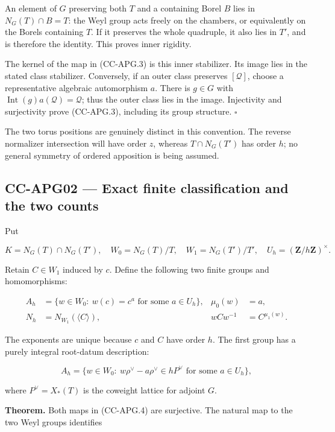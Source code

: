 An element of \(G\) preserving both \(T\) and a containing Borel \(B\)
lies in \(N_G(T)\cap B=T\): the Weyl group acts freely on the chambers,
or equivalently on the Borels containing \(T\). If it preserves the
whole quadruple, it also lies in \(T'\), and is therefore the identity.
This proves inner rigidity.

The kernel of the map in (CC-APG.3) is this inner stabilizer. Its image
lies in the stated class stabilizer. Conversely, if an outer class
preserves \([\mathcal Q]\), choose a representative algebraic
automorphism \(a\). There is \(g\in G\) with
\(\operatorname{Int}(g)a(\mathcal Q)=\mathcal Q\); thus the outer class
lies in the image. Injectivity and surjectivity prove (CC-APG.3),
including its group structure. \(\square\)

The two torus positions are genuinely distinct in this convention. The
reverse normalizer intersection will have order \(z\), whereas
\(T\cap N_G(T')\) has order \(h\); no general symmetry of ordered
apposition is being assumed.

\subsection{CC-APG02 --- Exact finite classification and the two
counts}\label{cc-apg02-exact-finite-classification-and-the-two-counts}

Put

\[
 K=N_G(T)\cap N_G(T'),\quad
 W_0=N_G(T)/T,\quad W_1=N_G(T')/T',
 \quad U_h=(\mathbf Z/h\mathbf Z)^\times.
\]

Retain \(C\in W_1\) induced by \(c\). Define the following two finite
groups and homomorphisms:

\[
\begin{aligned}
 A_h&=\{w\in W_0:\ w(c)=c^a\text{ for some }a\in U_h\},
 &\mu_0(w)&=a,\\
 N_h&=N_{W_1}(\langle C\rangle),
 &w C w^{-1}&=C^{\mu_1(w)}.
\end{aligned}
 \tag{CC-APG.4}
\]

The exponents are unique because \(c\) and \(C\) have order \(h\). The
first group has a purely integral root-datum description:

\[
 A_h=\{w\in W_0:\ w\rho^\vee-a\rho^\vee\in hP^\vee
                   \text{ for some }a\in U_h\},
 \tag{CC-APG.5}
\]

where \(P^\vee=X_*(T)\) is the coweight lattice for adjoint \(G\).

\textbf{Theorem.} Both maps in (CC-APG.4) are surjective. The natural
map to the two Weyl groups identifies

